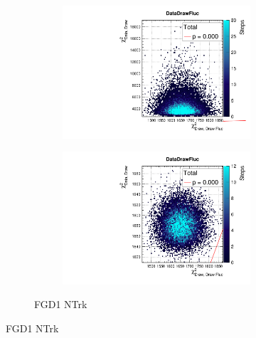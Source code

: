 \begin{figure}[h]
\begin{subfigure}[t]{\textwidth}
\begin{subfigure}[t]{0.24\textwidth}
\includegraphics[width=\textwidth, trim={0mm 0mm 0mm 8mm}, clip,page=110]{figures/mach3/data/priorpred/2017b_NewDet_3Xsec_4Det_5Flux_NewXSecTune_Data_merge_PriorPred_procs}
\end{subfigure}
\begin{subfigure}[t]{0.24\textwidth}
	\includegraphics[width=\textwidth, trim={0mm 0mm 0mm 8mm}, clip,page=110]{figures/mach3/data/postpred/2017b_NewData_NewDet_UpdXsecStep_2Xsec_4Det_5Flux_0_PostPred_procs}
\end{subfigure}
\caption{FGD1 NTrk \numubar}
\end{subfigure}


\end{figure}
